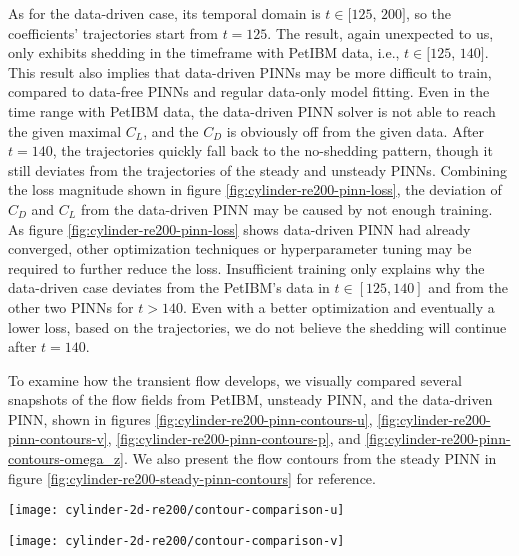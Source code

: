 As for the data-driven case, its temporal domain is $t\in[125$, $200]$, so the coefficients' trajectories start from $t=125$.
The result, again unexpected to us, only exhibits shedding in the timeframe with PetIBM data, i.e., $t\in[125$, $140]$.
This result also implies that data-driven PINNs may be more difficult to train, compared to data-free PINNs and regular data-only model fitting.
Even in the time range with PetIBM data, the data-driven PINN solver is not able to reach the given maximal $C_L$, and the $C_D$ is obviously off from the given data.
After $t=140$, the trajectories quickly fall back to the no-shedding pattern, though it still deviates from the trajectories of the steady and unsteady PINNs.
Combining the loss magnitude shown in figure \ref{fig:cylinder-re200-pinn-loss}, the deviation of $C_D$ and $C_L$ from the data-driven PINN may be caused by not enough training.
As figure \ref{fig:cylinder-re200-pinn-loss} shows data-driven PINN had already converged, other optimization techniques or hyperparameter tuning may be required to further reduce the loss.
Insufficient training only explains why the data-driven case deviates from the PetIBM's data in $t \in [125, 140]$ and from the other two PINNs for $t > 140$.
Even with a better optimization and eventually a lower loss, based on the trajectories, we do not believe the shedding will continue after $t=140$.

To examine how the transient flow develops, we visually compared several snapshots of the flow fields from PetIBM, unsteady PINN, and the data-driven PINN, shown in figures \ref{fig:cylinder-re200-pinn-contours-u}, \ref{fig:cylinder-re200-pinn-contours-v}, \ref{fig:cylinder-re200-pinn-contours-p}, and \ref{fig:cylinder-re200-pinn-contours-omega_z}.
We also present the flow contours from the steady PINN in figure \ref{fig:cylinder-re200-steady-pinn-contours} for reference.

\begin{figure*}
    \centering%
    \texttt{[image: cylinder-2d-re200/contour-comparison-u]}%
    \caption{%
        $u$-velocity comparison of 2D cylinder flow of $Re=\num{200}$ between PetIBM, unsteady PINN, and data-driven PINN. Figure under CC-BY \cite{chuang_barba_2023_fig12}.
    }
    \label{fig:cylinder-re200-pinn-contours-u}%
\end{figure*}

\begin{figure*}
    \centering%
    \texttt{[image: cylinder-2d-re200/contour-comparison-v]}%
    \caption{%
        $v$-velocity comparison of 2D cylinder flow of $Re=\num{200}$ between PetIBM, unsteady PINN, and data-driven PINN.
    }
    \label{fig:cylinder-re200-pinn-contours-v}%
\end{figure*}

